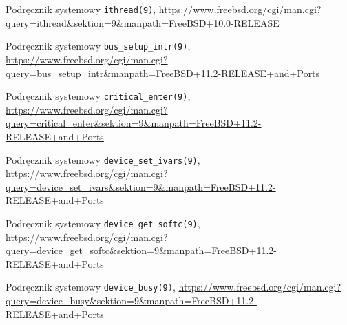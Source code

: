 \documentclass[shortabstract,inz]{iithesis}
\begin{document}
\begin{thebibliography}{1}
 Podręcznik systemowy \texttt{ithread(9)},
\url{https://www.freebsd.org/cgi/man.cgi?query=ithread&sektion=9&manpath=FreeBSD+10.0-RELEASE}

 Podręcznik systemowy \texttt{bus\_setup\_intr(9)},
\url{https://www.freebsd.org/cgi/man.cgi?query=bus_setup_intr&manpath=FreeBSD+11.2-RELEASE+and+Ports}

 Podręcznik systemowy \texttt{critical\_enter(9)},
\url{https://www.freebsd.org/cgi/man.cgi?query=critical_enter&sektion=9&manpath=FreeBSD+11.2-RELEASE+and+Ports}

 Podręcznik systemowy \texttt{device\_set\_ivars(9)},
\url{https://www.freebsd.org/cgi/man.cgi?query=device_set_ivars&sektion=9&manpath=FreeBSD+11.2-RELEASE+and+Ports}

 Podręcznik systemowy \texttt{device\_get\_softc(9)},
\url{https://www.freebsd.org/cgi/man.cgi?query=device_get_softc&sektion=9&manpath=FreeBSD+11.2-RELEASE+and+Ports}

 Podręcznik systemowy \texttt{device\_busy(9)},
\url{https://www.freebsd.org/cgi/man.cgi?query=device_busy&sektion=9&manpath=FreeBSD+11.2-RELEASE+and+Ports}

\end{thebibliography}
\end{document}
